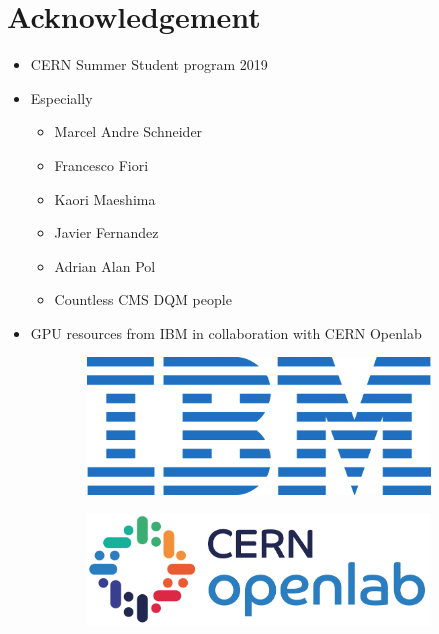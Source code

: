 \chapter*{Acknowledgement}


\begin{itemize}
    \item CERN Summer Student program 2019
    \item Especially
    \begin{itemize}
        \item Marcel Andre Schneider
        \item Francesco Fiori
        \item Kaori Maeshima
        \item Javier Fernandez
        \item Adrian Alan Pol
        \item Countless CMS DQM people
    \end{itemize}
    \item GPU resources from IBM in collaboration with CERN Openlab
\end{itemize}



\begin{figure}[h!]
    \begin{subfigure}[b]{1.2in}
        \includegraphics[width=\linewidth]{images/ibm.png}
    \end{subfigure}
    \begin{subfigure}[b]{1.8in}
        \includegraphics[width=\linewidth]{images/cern_openlab.png}
    \end{subfigure}
\end{figure}